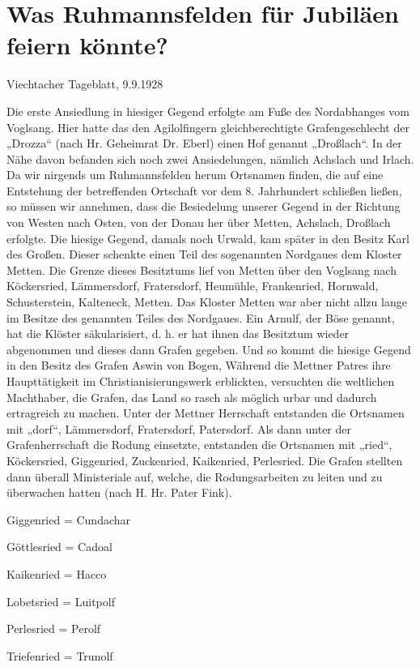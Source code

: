 \documentclass[12pt,a4paper]{book}
\begin{document}
\part{Was Ruhmannsfelden für Jubiläen feiern könnte?}

Viechtacher Tageblatt, 9.9.1928

Die erste Ansiedlung in hiesiger Gegend erfolgte am Fuße des Nordabhanges vom
Voglsang. Hier hatte das den Agilolfingern gleichberechtigte Grafengeschlecht
der „Drozza“ (nach Hr. Geheimrat Dr. Eberl) einen Hof genannt „Droßlach“. In der
Nähe davon befanden sich noch zwei Ansiedelungen, nämlich Achslach und Irlach.
Da wir nirgends um Ruhmannsfelden herum Ortsnamen finden, die auf eine
Entstehung der betreffenden Ortschaft vor dem 8. Jahrhundert schließen ließen,
so müssen wir annehmen, dass die Besiedelung unserer Gegend in der Richtung von
Westen nach Osten, von der Donau her über Metten, Achslach, Droßlach erfolgte.
Die hiesige Gegend, damals noch Urwald, kam später in den Besitz Karl des
Großen. Dieser schenkte einen Teil des sogenannten Nordgaues dem Kloster Metten.
Die Grenze dieses Besitztums lief von Metten über den Voglsang nach Köckersried,
Lämmersdorf, Fratersdorf, Heumühle, Frankenried, Hornwald, Schusterstein,
Kalteneck, Metten. Das Kloster Metten war aber nicht allzu lange im Besitze des
genannten Teiles des Nordgaues. Ein Arnulf, der Böse genannt, hat die Klöster
säkularisiert, d. h. er hat ihnen das Besitztum wieder abgenommen und dieses
dann Grafen gegeben. Und so kommt die hiesige Gegend in den Besitz des Grafen
Aswin von Bogen, Während die Mettner Patres ihre Haupttätigkeit im
Christianisierungswerk erblickten, versuchten die weltlichen Machthaber, die
Grafen, das Land so rasch als möglich urbar und dadurch ertragreich zu machen.
Unter der Mettner Herrschaft entstanden die Ortsnamen mit „dorf“, Lämmersdorf,
Fratersdorf, Patersdorf. Als dann unter der Grafenherrschaft die Rodung
einsetzte, entstanden die Ortsnamen mit „ried“, Köckersried, Giggenried,
Zuckenried, Kaikenried, Perlesried. Die Grafen stellten dann überall
Ministeriale auf, welche, die Rodungsarbeiten zu leiten und zu überwachen hatten
(nach H. Hr. Pater Fink).

Giggenried  = Cundachar

Göttlesried = Cadoal

Kaikenried = Hacco

Lobetsried = Luitpolf

Perlesried = Perolf

Triefenried = Trunolf
\end{document}
